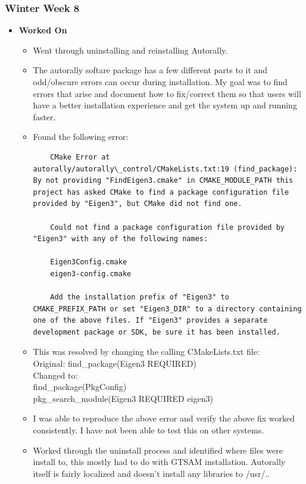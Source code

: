 \documentclass[compsoc,draftclsnofoot,onecolumn,10pt]{IEEEtran}
\begin{document}
\subsubsection{Winter Week 8}
\begin{itemize}
    \item {\textbf{Worked On}}
    \begin{itemize}
        \item Went through uninstalling and reinstalling Autorally.
        \item The autorally softare package has a few different parts to it and odd/obscure errors can occur during installation. My goal was to find errors that arise and document how to fix/correct them so that users will have a better installation experience and get the system up and running faster.

        \item Found the following error:
\begin{verbatim}
    CMake Error at autorally/autorally\_control/CMakeLists.txt:19 (find_package): By not providing "FindEigen3.cmake" in CMAKE_MODULE_PATH this project has asked CMake to find a package configuration file provided by "Eigen3", but CMake did not find one.

    Could not find a package configuration file provided by "Eigen3" with any of the following names:

    Eigen3Config.cmake
    eigen3-config.cmake

    Add the installation prefix of "Eigen3" to CMAKE_PREFIX_PATH or set "Eigen3_DIR" to a directory containing one of the above files. If "Eigen3" provides a separate development package or SDK, be sure it has been installed.
\end{verbatim}

    \item This was resolved by changing the calling CMakeLists.txt file:\\
    Original: find\_package(Eigen3 REQUIRED)\\
    Changed to:\\
    find\_package(PkgConfig)\\
    pkg\_search\_module(Eigen3 REQUIRED eigen3)\\

    \item I was able to reproduce the above error and verify the above fix worked consistently. I have not been able to test this on other systems.

    \item Worked through the uninstall process and identified where files were install to, this mostly had to do with GTSAM installation. Autorally itself is fairly localized and doesn't install any libraries to /usr/..


\end{itemize}
\end{itemize}
\end{document}
